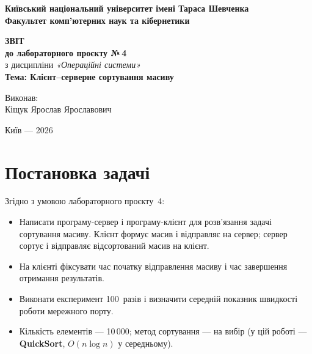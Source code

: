\documentclass[a4paper,12pt]{article}
\begin{document}
\begin{titlepage}
    \thispagestyle{empty}
    \begin{center}
        \textbf{Київський національний університет імені Тараса Шевченка}\\
        \textbf{Факультет комп'ютерних наук та кібернетики}
    \end{center}

    \vspace{4cm}

    \begin{center}
        \textbf{\Large ЗВІТ}\\
        \vspace{0.5cm}
        \textbf{\large до лабораторного проєкту №\,4}\\
        \vspace{0.5cm}
        з дисципліни \textit{«Операційні системи»}\\
        \vspace{0.7cm}
        \textbf{Тема: Клієнт--серверне сортування масиву}
    \end{center}

    \vfill

    \begin{flushright}
        Виконав:\\
        Кіщук Ярослав Ярославович
    \end{flushright}

    \vspace{1.5cm}

    \begin{center}
        Київ --- 2026
    \end{center}
\end{titlepage}

\section{Постановка задачі}

Згідно з умовою лабораторного проєкту~4:

\begin{itemize}
    \item Написати програму-сервер і програму-клієнт для розв'язання задачі
    сортування масиву. Клієнт формує масив і відправляє на сервер; сервер
    сортує і відправляє відсортований масив на клієнт.
    \item На клієнті фіксувати час початку відправлення масиву і час
    завершення отримання результатів.
    \item Виконати експеримент 100~разів і визначити середній показник
    швидкості роботи мережного порту.
    \item Кількість елементів --- 10\,000; метод сортування --- на вибір
    (у цій роботі --- \textbf{QuickSort}, $O(n \log n)$ у середньому).
\end{itemize}
\end{document}
